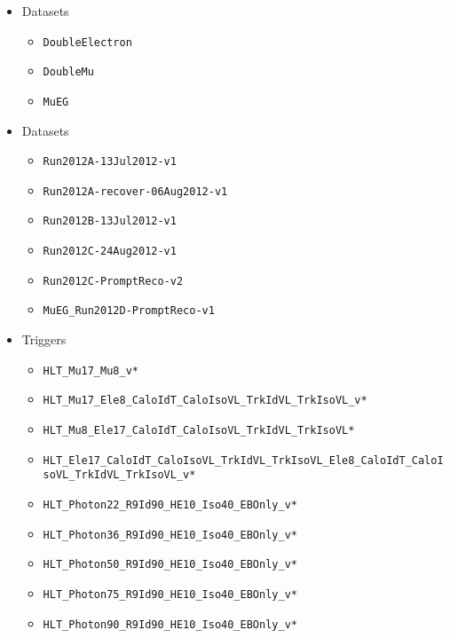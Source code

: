 \begin{itemize}
\item Datasets
  \begin{itemize}
  \item \verb=DoubleElectron=
  \item \verb=DoubleMu=
  \item \verb=MuEG=
  \end{itemize}
\item Datasets
  \begin{itemize}
  \item \verb=Run2012A-13Jul2012-v1=
  \item \verb=Run2012A-recover-06Aug2012-v1=
  \item \verb=Run2012B-13Jul2012-v1=
  \item \verb=Run2012C-24Aug2012-v1=
  \item \verb=Run2012C-PromptReco-v2=
  \item \verb=MuEG_Run2012D-PromptReco-v1=
  \end{itemize}

\item Triggers
  \begin{itemize}
    \item \verb=HLT_Mu17_Mu8_v*=
    \item \verb=HLT_Mu17_Ele8_CaloIdT_CaloIsoVL_TrkIdVL_TrkIsoVL_v*=
    \item \verb=HLT_Mu8_Ele17_CaloIdT_CaloIsoVL_TrkIdVL_TrkIsoVL*=
    \item {\footnotesize \verb=HLT_Ele17_CaloIdT_CaloIsoVL_TrkIdVL_TrkIsoVL_Ele8_CaloIdT_CaloIsoVL_TrkIdVL_TrkIsoVL_v*=}
    \item \verb=HLT_Photon22_R9Id90_HE10_Iso40_EBOnly_v*=
    \item \verb=HLT_Photon36_R9Id90_HE10_Iso40_EBOnly_v*=
    \item \verb=HLT_Photon50_R9Id90_HE10_Iso40_EBOnly_v*=
    \item \verb=HLT_Photon75_R9Id90_HE10_Iso40_EBOnly_v*=
    \item \verb=HLT_Photon90_R9Id90_HE10_Iso40_EBOnly_v*=
  \end{itemize}
\end{itemize}
  
